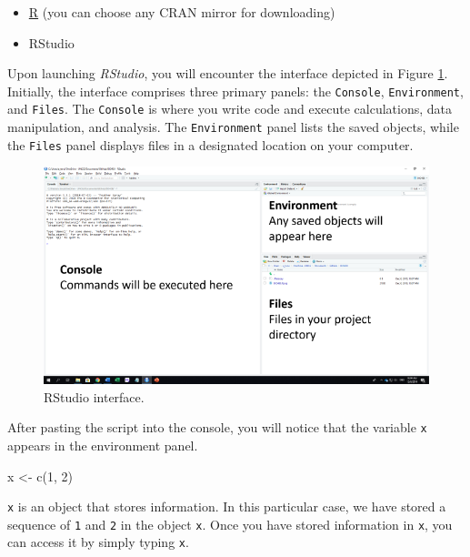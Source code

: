 \documentclass[
]{article}
\newenvironment{Shaded}{\begin{snugshade}}{\end{snugshade}}
\newcommand{\DecValTok}[1]{\textcolor[rgb]{0.00,0.00,0.81}{#1}}
\newcommand{\FunctionTok}[1]{\textcolor[rgb]{0.00,0.00,0.00}{#1}}
\newcommand{\NormalTok}[1]{#1}
\newcommand{\OtherTok}[1]{\textcolor[rgb]{0.56,0.35,0.01}{#1}}
\providecommand{\tightlist}{%
  \setlength{\itemsep}{0pt}\setlength{\parskip}{0pt}}
\begin{document}
\begin{itemize}
\tightlist
\item
  \href{https://www.r-project.org/}{R} (you can choose any CRAN mirror for downloading)
\item
  RStudio
\end{itemize}

Upon launching \emph{RStudio}, you will encounter the interface depicted in Figure \ref{fig:ui}. Initially, the interface comprises three primary panels: the \texttt{Console}, \texttt{Environment}, and \texttt{Files}. The \texttt{Console} is where you write code and execute calculations, data manipulation, and analysis. The \texttt{Environment} panel lists the saved objects, while the \texttt{Files} panel displays files in a designated location on your computer.

\begin{figure}

{\centering \includegraphics[width=9.47in]{image/r_image01} 

}

\caption{RStudio interface.}\label{fig:ui}
\end{figure}

After pasting the script into the console, you will notice that the variable \texttt{x} appears in the environment panel.

\begin{Shaded}
\begin{Highlighting}[]
\NormalTok{x }\OtherTok{\textless{}{-}} \FunctionTok{c}\NormalTok{(}\DecValTok{1}\NormalTok{, }\DecValTok{2}\NormalTok{)}
\end{Highlighting}
\end{Shaded}

\texttt{x} is an object that stores information. In this particular case, we have stored a sequence of \texttt{1} and \texttt{2} in the object \texttt{x}. Once you have stored information in \texttt{x}, you can access it by simply typing \texttt{x}.
\end{document}
